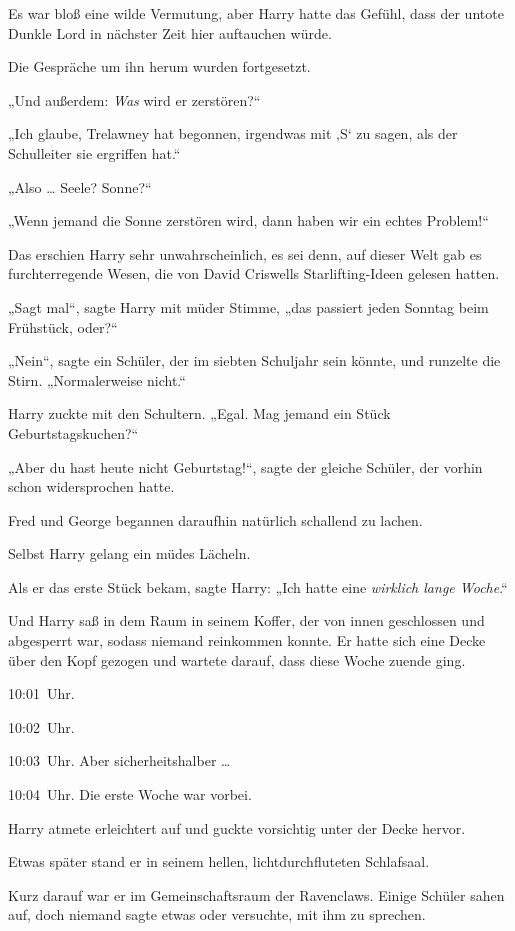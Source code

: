 Es war bloß eine wilde Vermutung, aber Harry hatte das Gefühl, dass der untote Dunkle Lord in nächster Zeit hier auftauchen würde. 

Die Gespräche um ihn herum wurden fortgesetzt. 

„Und außerdem: \emph{Was} wird er zerstören?“ 

„Ich glaube, Trelawney hat begonnen, irgendwas mit ‚S‘ zu sagen, als der Schulleiter sie ergriffen hat.“ 

„Also … Seele? Sonne?“ 

„Wenn jemand die Sonne zerstören wird, dann haben wir ein echtes Problem!“ 

Das erschien Harry sehr unwahrscheinlich, es sei denn, auf dieser Welt gab es furchterregende Wesen, die von David Criswells Starlifting-Ideen gelesen hatten. 

„Sagt mal“, sagte Harry mit müder Stimme, „das passiert jeden Sonntag beim Frühstück, oder?“ 

„Nein“, sagte ein Schüler, der im siebten Schuljahr sein könnte, und runzelte die Stirn. „Normalerweise nicht.“ 

Harry zuckte mit den Schultern. „Egal. Mag jemand ein Stück Geburtstagskuchen?“ 

„Aber du hast heute nicht Geburtstag!“, sagte der gleiche Schüler, der vorhin schon widersprochen hatte. 

Fred und George begannen daraufhin natürlich schallend zu lachen. 

Selbst Harry gelang ein müdes Lächeln. 

Als er das erste Stück bekam, sagte Harry: „Ich hatte eine \emph{wirklich lange Woche}.“ 

\later 

Und Harry saß in dem Raum in seinem Koffer, der von innen geschlossen und abgesperrt war, sodass niemand reinkommen konnte. Er hatte sich eine Decke über den Kopf gezogen und wartete darauf, dass diese Woche zuende ging. 

10:01~Uhr. 

10:02~Uhr. 

10:03~Uhr. Aber sicherheitshalber … 

10:04~Uhr. Die erste Woche war vorbei. 

Harry atmete erleichtert auf und guckte vorsichtig unter der Decke hervor. 

Etwas später stand er in seinem hellen, lichtdurchfluteten Schlafsaal. 

Kurz darauf war er im Gemeinschaftsraum der Ravenclaws. Einige Schüler sahen auf, doch niemand sagte etwas oder versuchte, mit ihm zu sprechen. 

